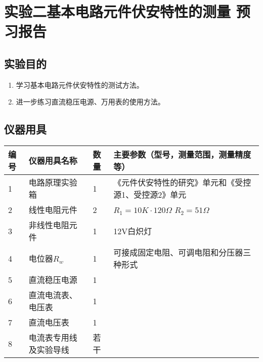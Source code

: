 \documentclass[dvipsnames, svgnames,a4paper,11pt]{article}
\begin{document}
	
	
	\clearpage
	\tableofcontents
	\clearpage
	
	
	
	
	\setcounter{section}{0}
	\section{实验二\quad 基本电路元件伏安特性的测量 \quad\heiti 预习报告}
	
	\subsection{实验目的}
	\begin{enumerate}
		\item 学习基本电路元件伏安特性的测试方法。
		
		\item 进一步练习直流稳压电源、万用表的使用方法。
		
	\end{enumerate}
	
	\subsection{仪器用具}
	\begin{table}[htbp]
		\centering
		\renewcommand\arraystretch{1.6}
		\begin{tabular}{p{}|p{}|p{}|p{}}
			\hline
			编号& 仪器用具名称 & 数量 &  主要参数（型号，测量范围，测量精度等） \\
			\hline
			1 & 电路原理实验箱 & 1 & {\footnotesize《元件伏安特性的研究》单元和《受控源1、受控源2》单元}  \\
			\hline
			2 & 线性电阻元件   & 2 & $R_1=10K·120\Omega$ \quad $R_2=51\Omega$ \\
			\hline
			3 & 非线性电阻元件 & 1 & 12V白炽灯 \\
			\hline
			4 & 电位器$R_w$ & 1 & 可接成固定电阻、可调电阻和分压器三种形式 \\
			\hline
			5 & 直流稳压电源  & 1 &  \\
			\hline
			6 & 直流电流表、电压表  & 1 &  \\
			\hline
			7 & 直流电压表  & 1 &  \\
			\hline
			8 & 电流表专用线及实验导线  & 若干 &  \\
			\hline
		\end{tabular}
	\end{table}
	
\end{document}
